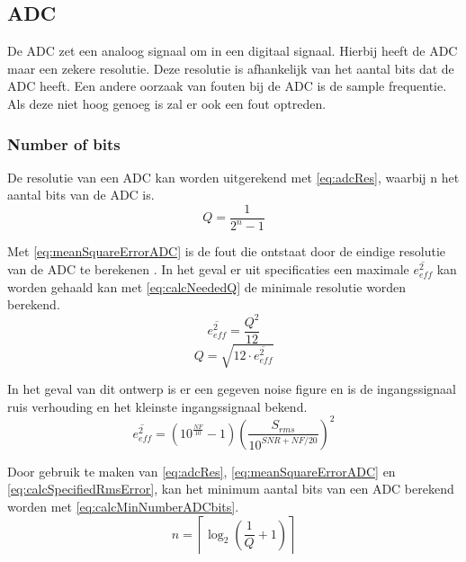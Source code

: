 \subsection{ADC}

De ADC zet een analoog signaal om in een digitaal signaal. Hierbij heeft de ADC maar een zekere resolutie. Deze resolutie is afhankelijk van het aantal bits dat de ADC heeft. Een andere oorzaak van fouten bij de ADC is de sample frequentie. Als deze niet hoog genoeg is zal er ook een fout optreden.

\subsubsection{Number of bits} \label{sec:ADC:numBits}
De resolutie van een ADC kan worden uitgerekend met \autoref{eq:adcRes}, waarbij n het aantal bits van de ADC is.
\begin{equation}\label{eq:adcRes}
    Q=\frac{1}{2^n-1}
\end{equation}

Met \autoref{eq:meanSquareErrorADC} is de fout die ontstaat door de eindige resolutie van de ADC te berekenen \cite{MJHcalcADC}. In het geval er uit specificaties een maximale $\overline{e_{eff}^2}$ kan worden gehaald kan met \autoref{eq:calcNeededQ} de minimale resolutie worden berekend.
\begin{equation}\label{eq:meanSquareErrorADC} 
    \overline{e_{eff}^2}=\frac{Q^2}{12}
\end{equation}
\begin{equation}\label{eq:calcNeededQ}
    Q=\sqrt{12\cdot\overline{e_{eff}^2}}
\end{equation}

In het geval van dit ontwerp is er een gegeven noise figure en is de ingangssignaal ruis verhouding en het kleinste ingangssignaal bekend. %
\begin{equation}\label{eq:calcSpecifiedRmsError}
    \overline{e_{eff}^2}=\left(10^{\frac{NF}{10}}-1\right)\left(\frac{S_{rms}}{10^{SNR+NF/20}}\right)^2
\end{equation}

Door gebruik te maken van \autoref{eq:adcRes}, \autoref{eq:meanSquareErrorADC} en \autoref{eq:calcSpecifiedRmsError}, kan het minimum aantal bits van een ADC berekend worden met \autoref{eq:calcMinNumberADCbits}.
\begin{equation}\label{eq:calcMinNumberADCbits}
    n=\left\lceil\log_2\left(\frac{1}{Q}+1\right)\right\rceil
\end{equation}

